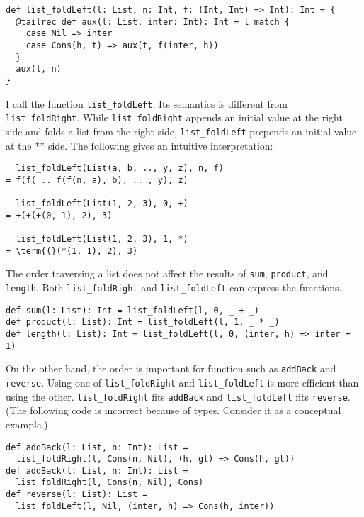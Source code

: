 \begin{verbatim}
def list_foldLeft(l: List, n: Int, f: (Int, Int) => Int): Int = {
  @tailrec def aux(l: List, inter: Int): Int = l match {
    case Nil => inter
    case Cons(h, t) => aux(t, f(inter, h))
  }
  aux(l, n)
}
\end{verbatim}

I call the function \verb!list_foldLeft!. Its semantics is different from
\verb!list_foldRight!. While \verb!list_foldRight! appends an initial value at
the right side and folds a list from the right side, \verb!list_foldLeft!
prepends an initial value at the ** side. The following gives an intuitive
interpretation:

\begin{verbatim}
  list_foldLeft(List(a, b, .., y, z), n, f)
= f(f( .. f(f(n, a), b), .. , y), z)

  list_foldLeft(List(1, 2, 3), 0, +)
= +(+(+(0, 1), 2), 3)

  list_foldLeft(List(1, 2, 3), 1, *)
= \term{(}(*(1, 1), 2), 3)
\end{verbatim}

The order traversing a list does not affect the results of \verb!sum!,
\verb!product!, and \verb!length!. Both \verb!list_foldRight! and
\verb!list_foldLeft! can express the functions.

\begin{verbatim}
def sum(l: List): Int = list_foldLeft(l, 0, _ + _)
def product(l: List): Int = list_foldLeft(l, 1, _ * _)
def length(l: List): Int = list_foldLeft(l, 0, (inter, h) => inter + 1)
\end{verbatim}

On the other hand, the order is important for function such as \verb!addBack! and
\verb!reverse!. Using one of \verb!list_foldRight! and \verb!list_foldLeft! is
more efficient than using the other. \verb!list_foldRight! fits \verb!addBack!
and \verb!list_foldLeft! fits \verb!reverse!. (The following code is incorrect
because of types. Consider it as a conceptual example.)

\begin{verbatim}
def addBack(l: List, n: Int): List =
  list_foldRight(l, Cons(n, Nil), (h, gt) => Cons(h, gt))
def addBack(l: List, n: Int): List =
  list_foldRight(l, Cons(n, Nil), Cons)
def reverse(l: List): List =
  list_foldLeft(l, Nil, (inter, h) => Cons(h, inter))
\end{verbatim}

